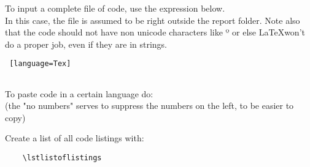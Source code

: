 \par To input a complete file of code, use the expression below. \\
In this case, the file is assumed to be right outside the report folder. Note also that the code should not have non unicode characters like º or else \LaTeX won't do a proper job, even if they are in strings.
\begin{lstlisting} [language=Tex]
    
\end{lstlisting}

\par To paste code in a certain language do:\\
(the "no numbers" serves to suppress the numbers on the left, to be easier to copy)


\par Create a list of all code listings with:
\begin{lstlisting}
    \lstlistoflistings
\end{lstlisting}








